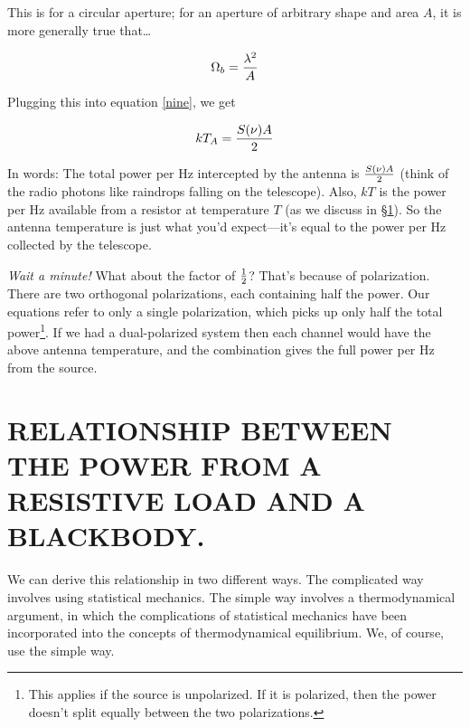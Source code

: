 \documentclass[psfig,preprint]{aastex}
\begin{document}
\noindent This is for a circular aperture; for an aperture of arbitrary
shape and area $A$, it is more generally true that\dots

\begin{equation} \Omega_b =  {\lambda^2 \over A} 
\end{equation}

\noindent Plugging this into equation \ref{nine}, we get

\begin{equation} k T_A = {S(\nu) A \over 2} 
\end{equation}

\noindent In words: The total power per Hz intercepted by the antenna is
${S(\nu) A \over 2}$ (think of the radio photons like raindrops falling
on the telescope).  Also, $kT$ is the power per Hz available from a
resistor at temperature $T$ (as we discuss in \S \ref{4p3}).  So the
antenna temperature is just what you'd expect---it's equal to the power
per Hz collected by the telescope. 

	{\it Wait a minute!} What about the factor of $1 \over 2$? That's
because of polarization.  There are two orthogonal polarizations, each
containing half the power.  Our equations refer to only a single
polarization, which picks up only half the total power\footnote{This
applies if the source is unpolarized. If it is polarized, then the power
doesn't split equally between the two polarizations.}.  If we had a
dual-polarized system then each channel would have the above antenna
temperature, and the combination gives the full power per Hz from the
source. 

\section {RELATIONSHIP BETWEEN THE POWER FROM A RESISTIVE
LOAD AND A BLACKBODY.} 

\label{4p3}

	We can derive this relationship in two different ways.  The
complicated way involves using statistical mechanics.  The simple way
involves a thermodynamical argument, in which the complications of
statistical mechanics have been incorporated into the concepts of
thermodynamical equilibrium.  We, of course, use the simple way. 

\end{document}
